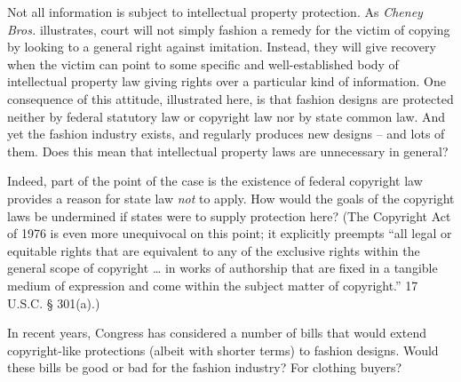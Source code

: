 \item Not all information is subject to intellectual property protection. As
\textit{Cheney Bros.} illustrates, court will not simply fashion a remedy for
the victim of copying by looking to a general right against imitation. Instead,
they will give recovery when the victim can point to some specific and
well-established body of intellectual property law giving rights over a
particular kind of information. One consequence of this attitude, illustrated
here, is that fashion designs are protected neither by federal statutory law or
copyright law nor by state common law. And yet the fashion industry exists, and
regularly produces new designs -- and lots of them. Does this mean that
intellectual property laws are unnecessary in general?


\item Indeed, part of the point of the case is the existence of federal
copyright law provides a reason for state law \textit{not} to apply. How would
the goals of the copyright laws be undermined if states were to supply
protection here? (The Copyright Act of 1976 is even more unequivocal on this
point; it explicitly preempts ``all legal or equitable rights that are
equivalent to any of the exclusive rights within the general scope of copyright
{\dots} in works of authorship that are fixed in a tangible medium of
expression and come within the subject matter of copyright.'' 17 U.S.C. {\S}
301(a).)


\item In recent years, Congress has considered a number of bills that would
extend copyright-like protections (albeit with shorter terms) to fashion
designs. Would these bills be good or bad for the fashion industry? For
clothing buyers? 

